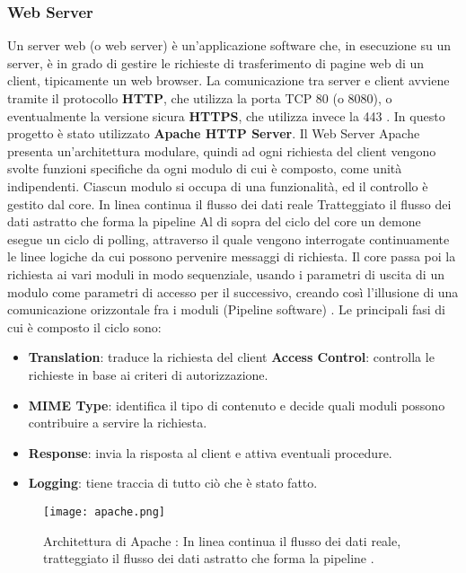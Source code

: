 \subsubsection{Web Server}
Un server web (o web server) è un'applicazione software che, in esecuzione su un server, è in grado di gestire le richieste di trasferimento di pagine web di un client, tipicamente un web browser. La comunicazione tra server e client avviene tramite il protocollo \textbf{HTTP}, che utilizza la porta TCP 80 (o 8080), o eventualmente la versione sicura \textbf{HTTPS}, che utilizza invece la 443 \cite{sito_webserver}.
\newline
\newline
\newline
In questo progetto è stato utilizzato \textbf{Apache HTTP Server}.
Il Web Server Apache presenta un'architettura modulare, quindi ad ogni richiesta del client vengono svolte funzioni specifiche da ogni modulo di cui è composto, come unità indipendenti. Ciascun modulo si occupa di una funzionalità, ed il controllo è gestito dal core.
In linea continua il flusso dei dati reale
Tratteggiato il flusso dei dati astratto che forma la pipeline
Al di sopra del ciclo del core un demone esegue un ciclo di polling, attraverso il quale vengono interrogate continuamente le linee logiche da cui possono pervenire messaggi di richiesta.
Il core passa poi la richiesta ai vari moduli in modo sequenziale, usando i parametri di uscita di un modulo come parametri di accesso per il successivo, creando così l'illusione di una comunicazione orizzontale fra i moduli (Pipeline software) \cite{sito_apache}.
Le principali fasi di cui è composto il ciclo sono:
\begin{itemize}
\item \textbf{Translation}: traduce la richiesta del client
\textbf{Access Control}: controlla le richieste in base ai criteri di autorizzazione.
\item \textbf{MIME Type}: identifica il tipo di contenuto e decide quali moduli possono contribuire a servire la richiesta.
\item \textbf{Response}: invia la risposta al client e attiva eventuali procedure.
\item \textbf{Logging}: tiene traccia di tutto ciò che è stato fatto.
\end{itemize}

 \begin{figure}[h]
	\centering
	\caption {Architettura di Apache : In linea continua il flusso dei dati reale,
		tratteggiato il flusso dei dati astratto che forma la pipeline \cite{sito_apache}.}
	\texttt{[image: apache.png]}
\end{figure}

